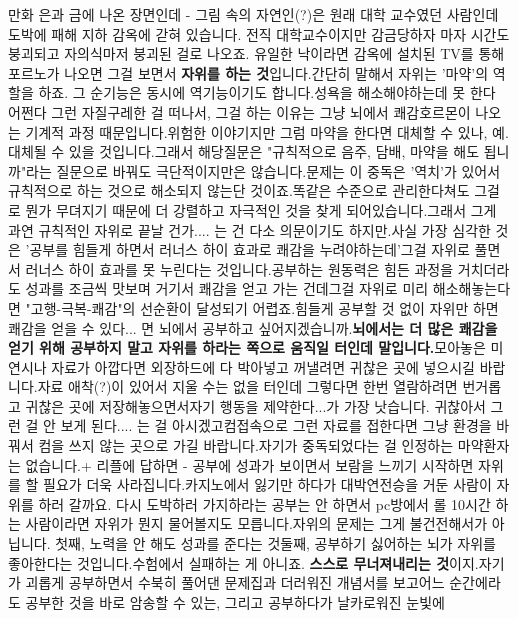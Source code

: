 만화 은과 금에 나온 장면인데 -
그림 속의 자연인(?)은 원래 대학 교수였던 사람인데 도박에 패해 지하 감옥에 갇혀 있습니다. 전직 대학교수이지만 감금당하자 마자 시간도 붕괴되고 자의식마저 붕괴된 걸로 나오죠. 유일한 낙이라면 감옥에 설치된 TV를 통해 포르노가 나오면 그걸 보면서 \textbf{자위를 하는 것}입니다.간단히 말해서 자위는 '마약'의 역할을 하죠. 그 순기능은 동시에 역기능이기도 합니다.성욕을 해소해야하는데 못 한다 어쩐다 그런 자질구레한 걸 떠나서, 그걸 하는 이유는 그냥 뇌에서 쾌감호르몬이 나오는 기계적 과정 때문입니다.위험한 이야기지만 그럼 마약을 한다면 대체할 수 있나, 예. 대체될 수 있을 것입니다.그래서 해당질문은 "규칙적으로 음주, 담배, 마약을 해도 됩니까"라는 질문으로 바꿔도 극단적이지만은 않습니다.문제는 이 중독은 '역치'가 있어서 규칙적으로 하는 것으로 해소되지 않는단 것이죠.똑같은 수준으로 관리한다쳐도 그걸로 뭔가 무뎌지기 때문에 더 강렬하고 자극적인 것을 찾게 되어있습니다.그래서 그게 과연 규칙적인 자위로 끝날 건가.... 는 건 다소 의문이기도 하지만.사실 가장 심각한 것은 '공부를 힘들게 하면서 러너스 하이 효과로 쾌감을 누려야하는데'그걸 자위로 풀면서 러너스 하이 효과를 못 누린다는 것입니다.공부하는 원동력은 힘든 과정을 거치더라도 성과를 조금씩 맛보며 거기서 쾌감을 얻고 가는 건데그걸 자위로 미리 해소해놓는다면 "고행-극복-쾌감"의 선순환이 달성되기 어렵죠.힘들게 공부할 것 없이 자위만 하면 쾌감을 얻을 수 있다... 면 뇌에서 공부하고 싶어지겠습니까.\textbf{뇌에서는 더 많은 쾌감을 얻기 위해 공부하지 말고 자위를 하라는 쪽으로 움직일 터인데 말입니다.}모아놓은 미연시나 자료가 아깝다면 외장하드에 다 박아넣고 꺼낼려면 귀찮은 곳에 넣으시길 바랍니다.자료 애착(?)이 있어서 지울 수는 없을 터인데 그렇다면 한번 열람하려면 번거롭고 귀찮은 곳에 저장해놓으면서자기 행동을 제약한다...가 가장 낫습니다. 귀찮아서 그런 걸 안 보게 된다.... 는 걸 아시겠고컴접속으로 그런 자료를 접한다면 그냥 환경을 바꿔서 컴을 쓰지 않는 곳으로 가길 바랍니다.자기가 중독되었다는 걸 인정하는 마약환자는 없습니다.+ 리플에 답하면 - 공부에 성과가 보이면서 보람을 느끼기 시작하면 자위를 할 필요가 더욱 사라집니다.카지노에서 잃기만 하다가 대박연전승을 거둔 사람이 자위를 하러 갈까요. 다시 도박하러 가지하라는 공부는 안 하면서 pc방에서 롤 10시간 하는 사람이라면 자위가 뭔지 물어볼지도 모릅니다.자위의 문제는 그게 불건전해서가 아닙니다. 첫째, 노력을 안 해도 성과를 준다는 것둘째, 공부하기 싫어하는 뇌가 자위를 좋아한다는 것입니다.수험에서 실패하는 게 아니죠. \textbf{스스로 무너져내리는 것}이지.자기가 괴롭게 공부하면서 수북히 풀어댄 문제집과 더러워진 개념서를 보고어느 순간에라도 공부한 것을 바로 암송할 수 있는, 그리고 공부하다가 날카로워진 눈빛에 